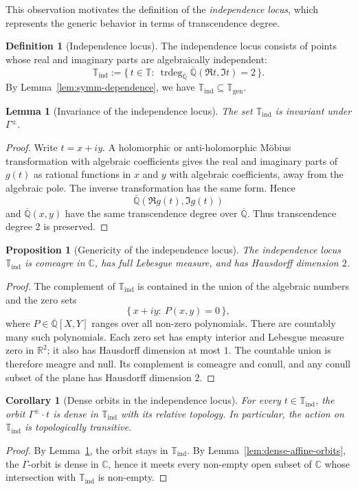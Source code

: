 \documentclass[11pt,a4paper]{article}
\theoremstyle{plain}
\newtheorem{corollary}[theorem]{Corollary}
\newtheorem{lemma}[theorem]{Lemma}
\newtheorem{proposition}[theorem]{Proposition}
\theoremstyle{definition}
\newtheorem{definition}[theorem]{Definition}
\newcommand{\C}{\mathbb{C}}
\newcommand{\R}{\mathbb{R}}
\newcommand{\Alg}{\overline{\mathbb{Q}}}
\newcommand{\trans}{\mathbb{T}}
\newcommand{\Tc}{\trans}
\DeclareMathOperator{\trdeg}{trdeg}
\newcommand{\sgen}{\Tc_{\mathrm{gen}}}
\newcommand{\sind}{\Tc_{\mathrm{ind}}}
\begin{document}
This observation motivates the definition of the \textit{independence locus}, which represents the generic behavior in terms of transcendence degree.

\begin{definition}[Independence locus]\label{def:ind-locus}
	The independence locus consists of points whose real and imaginary parts are algebraically independent:
	\[
		\sind:=\{\,t\in\Tc:\ \trdeg_{\Alg}\Alg(\Re t,\Im t)=2\,\}.
	\]
	By Lemma~\ref{lem:symm-dependence}, we have $\sind\subseteq\sgen$.
\end{definition}

\begin{lemma}[Invariance of the independence locus]\label{lem:ind-locus-invariant}
	The set $\sind$ is invariant under $\Gamma^{\pm}$.
\end{lemma}
\begin{proof}
	Write $t=x+iy$. A holomorphic or anti-holomorphic Möbius transformation with algebraic coefficients gives the real and imaginary parts of $g(t)$ as rational functions in $x$ and $y$ with algebraic coefficients, away from the algebraic pole. The inverse transformation has the same form. Hence
	\[
		\Alg(\Re g(t),\Im g(t))
	\]
	and $\Alg(x,y)$ have the same transcendence degree over $\Alg$. Thus transcendence degree $2$ is preserved. 
\end{proof}

\begin{proposition}[Genericity of the independence locus]\label{prop:ind-locus-generic}
	The independence locus $\sind$ is comeagre in $\C$, has full Lebesgue measure, and has Hausdorff dimension $2$.
\end{proposition}
\begin{proof}
	The complement of $\sind$ is contained in the union of the algebraic numbers and the zero sets
	\[
		\{\,x+iy:\ P(x,y)=0\,\},
	\]
	where $P\in\Alg[X,Y]$ ranges over all non-zero polynomials. There are countably many such polynomials. Each zero set has empty interior and Lebesgue measure zero in $\R^2$; it also has Hausdorff dimension at most $1$. The countable union is therefore meagre and null. Its complement is comeagre and conull, and any conull subset of the plane has Hausdorff dimension $2$.
\end{proof}

\begin{corollary}[Dense orbits in the independence locus]\label{cor:ind-locus-dense-orbits}
	For every $t\in\sind$, the orbit $\Gamma^{\pm}\cdot t$ is dense in $\sind$ with its relative topology. In particular, the action on $\sind$ is topologically transitive.
\end{corollary}
\begin{proof}
	By Lemma~\ref{lem:ind-locus-invariant}, the orbit stays in $\sind$. By Lemma~\ref{lem:dense-affine-orbits}, the $\Gamma$-orbit is dense in $\C$, hence it meets every non-empty open subset of $\C$ whose intersection with $\sind$ is non-empty.
\end{proof}
\end{document}
